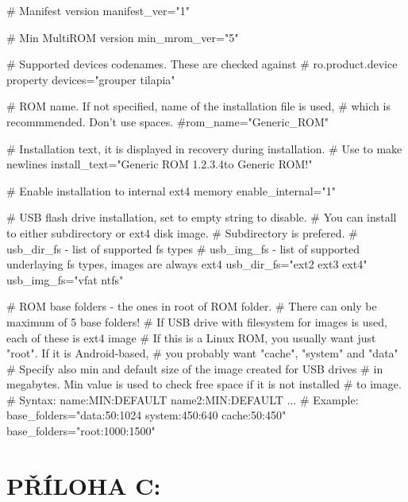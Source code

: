 \documentclass[12pt, a4paper, oneside]{article}
\begin{document}
\linespread{1.1}
\begin{listing}[H]
\begin{inicode}
# Manifest version
manifest_ver="1"

# Min MultiROM version
min_mrom_ver="5"

# Supported devices codenames. These are checked against
# ro.product.device property
devices="grouper tilapia"

# ROM name. If not specified, name of the installation file is used,
# which is recommmended. Don't use spaces.
#rom_name="Generic_ROM"

# Installation text, it is displayed in recovery during installation.
# Use \n to make newlines
install_text="Generic ROM 1.2.3.4\nWelcome to Generic ROM!\n\n"

# Enable installation to internal ext4 memory
enable_internal="1"

# USB flash drive installation, set to empty string to disable.
# You can install to either subdirectory or ext4 disk image.
# Subdirectory is prefered.
# usb_dir_fs - list of supported fs types
# usb_img_fs - list of supported underlaying fs types, images are always ext4
usb_dir_fs="ext2 ext3 ext4"
usb_img_fs="vfat ntfs"

# ROM base folders - the ones in root of ROM folder.
# There can only be maximum of 5 base folders!
# If USB drive with filesystem for images is used, each of these is ext4 image
# If this is a Linux ROM, you usually want just "root". If it is Android-based,
# you probably want "cache", "system" and "data"
# Specify also min and default size of the image created for USB drives
# in megabytes. Min value is used to check free space if it is not installed
# to image.
# Syntax: name:MIN:DEFAULT name2:MIN:DEFAULT ...
# Example: base_folders="data:50:1024 system:450:640 cache:50:450"
base_folders="root:1000:1500"
\end{inicode}
\caption{Obsah souboru \verb-manifest.txt- s komentáři}
\label{manifest-txt}
\end{listing}

\linespread{1.3}


\newpage
\section*{PŘÍLOHA C:}
\end{document}

